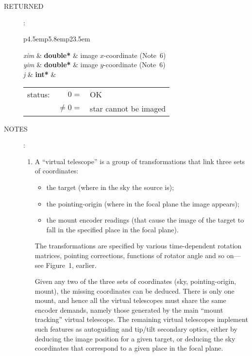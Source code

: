\documentclass[12pt,fleqn,twoside]{article}
\renewcommand{\_}{{\tt\char'137}}     %
\newcommand{\args}[2]
{
  \goodbreak
  \begin{description}
  \item[#1]: \\[1.5ex] \nopagebreak
    \hspace*{-0.9em}
    \begin{tabular}{p{4.5em}p{5.8em}p{23.5em}}
      #2
    \end{tabular}
  \end{description}
  \vspace{-3ex}
}
\newcommand{\spec}[3]
{
  {\em {#1}} & {\bf \mbox{#2}} & {#3}
}
\newcommand{\notes}[1]
{
  \goodbreak
  \begin{description}
    \item[NOTES]: \nopagebreak
        #1
  \end{description}
  \vspace{-3ex}
}
\begin{document}
\args{RETURNED}
{
\spec{xim}{double*}{image $x$-coordinate (Note~6)} \\
\spec{yim}{double*}{image $y$-coordinate (Note~6)} \\
\spec{j}{int*}{\hspace{-2ex}
               \begin{tabular}[t]{lrl}
                  status: & $  0 = $ & OK \\
                          & $ \neq 0 = $ & star cannot be imaged
               \end{tabular}
              }
}
\notes{
\begin{enumerate}
\setlength{\parskip}{\medskipamount}
\item A ``virtual telescope'' is a group of transformations that link
      three sets of coordinates:
      \begin{itemize}
      \item the target (where in the sky the source is);
      \item the pointing-origin (where in the focal plane the image
            appears);
      \item the mount encoder readings (that cause the image of the
            target to fall in the specified place in the focal plane).
      \end{itemize}
      The transformations are specified by various time-dependent
      rotation matrices, pointing corrections, functions of rotator
      angle and so on---see Figure~1, earlier.

      Given any two of the three sets of coordinates
      (sky, pointing-origin, mount), the missing coordinates
      can be deduced.  There is
      only one mount, and hence all the virtual telescopes must share
      the same encoder demands, namely those generated by the main
      ``mount tracking'' virtual telescope.  The remaining virtual
      telescopes implement such features as autoguiding and tip/tilt
      secondary optics, either by deducing the image position for a
      given target, or deducing the sky coordinates that correspond to
      a given place in the focal plane.


\end{enumerate}}
\end{document}
